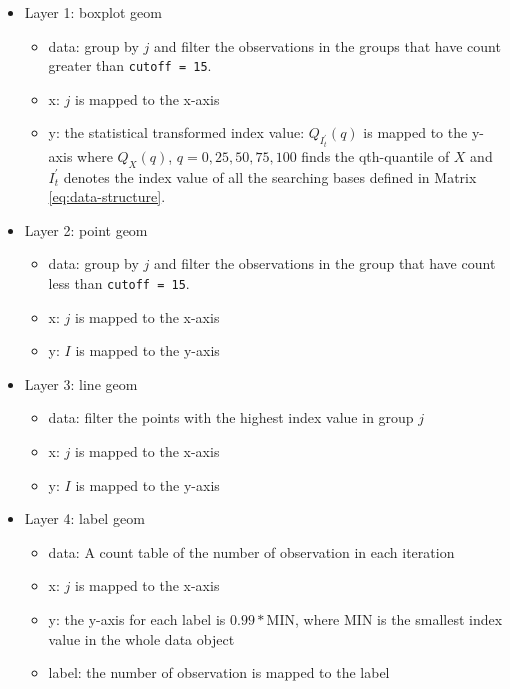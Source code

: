 \documentclass[12pt]{article}
\providecommand{\tightlist}{%
  \setlength{\itemsep}{0pt}\setlength{\parskip}{0pt}}
\begin{document}
\begin{itemize}
\tightlist
\item
  Layer 1: boxplot geom

  \begin{itemize}
  \tightlist
  \item
    data: group by \(j\) and filter the observations in the groups that have count greater than \texttt{cutoff\ =\ 15}.
  \item
    x: \(j\) is mapped to the x-axis
  \item
    y: the statistical transformed index value: \(Q_{I^{\prime}_t}(q)\) is mapped to the y-axis where \(Q_X(q)\), \(q = 0, 25, 50, 75, 100\) finds the qth-quantile of \(X\) and \(I^{\prime}_t\) denotes the index value of all the searching bases defined in Matrix \ref{eq:data-structure}.
  \end{itemize}
\item
  Layer 2: point geom

  \begin{itemize}
  \tightlist
  \item
    data: group by \(j\) and filter the observations in the group that have count less than \texttt{cutoff\ =\ 15}.
  \item
    x: \(j\) is mapped to the x-axis
  \item
    y: \(I\) is mapped to the y-axis
  \end{itemize}
\item
  Layer 3: line geom

  \begin{itemize}
  \tightlist
  \item
    data: filter the points with the highest index value in group \(j\)
  \item
    x: \(j\) is mapped to the x-axis
  \item
    y: \(I\) is mapped to the y-axis
  \end{itemize}
\item
  Layer 4: label geom

  \begin{itemize}
  \tightlist
  \item
    data: A count table of the number of observation in each iteration
  \item
    x: \(j\) is mapped to the x-axis
  \item
    y: the y-axis for each label is \(0.99 * \text{MIN}\), where \(\text{MIN}\) is the smallest index value in the whole data object
  \item
    label: the number of observation is mapped to the label
  \end{itemize}
\end{itemize}
\end{document}
